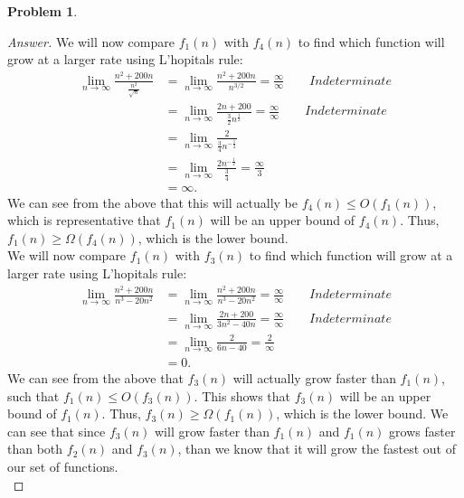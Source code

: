 \documentclass[11pt]{article}
\theoremstyle{definition}
\theoremstyle{definition}
\newtheorem{required}{Problem}
\theoremstyle{definition}
\begin{document}
\begin{required}
\begin{enumerate} [label=(\alph*)]
\begin{proof}[Answer]
We will now compare $f_1(n)$ with $f_4(n)$ to find which function will grow at a larger rate using L'hopitals rule: \\
\begin{align*}
\lim_{n \to \infty} \frac{n^2+200n}{\frac{n^2}{\sqrt{n}}} &= \lim_{n \to \infty} \frac{n^2+200n}{n^{3/2}}  = \frac{\infty}{\infty} \qquad Indeterminate  \\
&= \lim_{n \to \infty} \frac{2n+200}{\frac{3}{2}n^{\frac{1}{2}}}  = \frac{\infty}{\infty} \qquad Indeterminate \\
&= \lim_{n \to \infty} \frac{2}{\frac{3}{4}n^{-\frac{1}{2}}}  \\
&= \lim_{n \to \infty} \frac{2n^{-\frac{1}{2}}}{\frac{3}{4}}  = \frac{\infty}{3}  \\
&= \infty.
\end{align*} 
We can see from the above that this will actually be $f_4(n) \leq O(f_1(n))$, which is representative that $f_1(n)$ will be an upper bound of $f_4(n)$. Thus, $f_1(n) \geq \Omega(f_4(n))$, which is the lower bound. \\

We will now compare $f_1(n)$ with $f_3(n)$ to find which function will grow at a larger rate using L'hopitals rule: \\
\begin{align*}
\lim_{n \to \infty} \frac{n^2+200n}{n^{3}-20n^{2}} &= \lim_{n \to \infty} \frac{n^2+200n}{n^{3}-20n^{2}}  = \frac{\infty}{\infty} \qquad Indeterminate  \\
&= \lim_{n \to \infty} \frac{2n+200}{3n^{2}-40n}  = \frac{\infty}{\infty} \qquad Indeterminate \\
&= \lim_{n \to \infty} \frac{2}{6n-40}  = \frac{2}{\infty}  \\
&= 0.
\end{align*} 
We can see from the above that $f_3(n)$ will actually grow faster than $f_1(n)$, such that $f_1(n) \leq O(f_3(n))$. This shows that $f_3(n)$ will be an upper bound of $f_1(n)$. Thus, $f_3(n) \geq \Omega(f_1(n))$, which is the lower bound. We can see that since $f_3(n)$ will grow faster than $f_1(n)$ and $f_1(n)$ grows faster than both $f_2(n)$ and $f_3(n)$, than we know that it will grow the fastest out of our set of functions. \\


\end{proof}
\end{enumerate}
\end{required}
\end{document}
